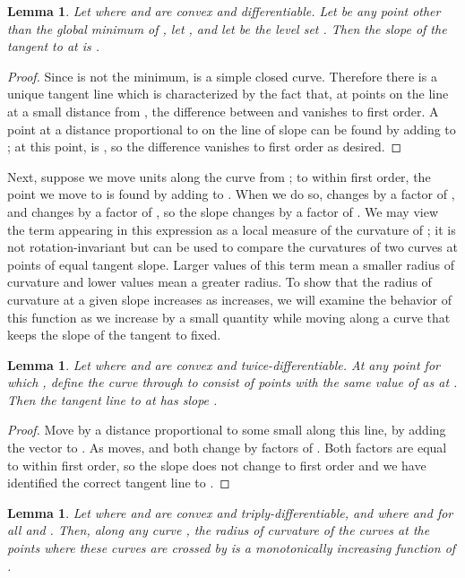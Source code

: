 \documentclass[10pt, conference, compsocconf]{IEEEtran}
\newtheorem{lemma}[theorem]{Lemma}
\begin{document}
\begin{lemma}
Let  where  and  are convex and differentiable.
Let   be any point other than the global minimum of , let , and let  be the level set .
Then the slope of the tangent to  at  is .
\end{lemma}

\begin{proof}
Since  is not the minimum,  is a simple closed curve.
Therefore there is a unique tangent line which is characterized by the fact that, at points  on the line at a small distance  from , the difference between  and  vanishes to first order. A point  at a distance proportional to  on the line of slope  can be found by adding  to ; at this point,  is , so the difference vanishes to first order as desired.
\end{proof}

Next, suppose we move  units along the curve  from ; to within
first order, the point we move to is found by adding
 to . When we do so, 
changes by a factor of
,
and  changes by a factor of , so the slope 
changes by a factor of . We may view the term  appearing in this expression as a local measure of the
curvature of ; it is not rotation-invariant but can be used to compare
the curvatures of two curves at points of equal tangent slope. Larger
values of this term mean a smaller radius of curvature and lower values mean a greater
radius. To show that the radius of curvature at a given slope increases as  increases, we will examine the behavior of this function as we increase  by a small quantity  while moving  along a curve that keeps the slope of the tangent to  fixed.

\begin{lemma}
Let  where  and  are convex and twice-differentiable.
At any point  for which , define the curve  through  to consist of points with the same value of  as at . Then the tangent line to  at  has slope .
\end{lemma}

\begin{proof}
Move  by a distance proportional to some small  along this line, by adding the vector  to . As  moves,  and  both change by factors of . Both factors are equal to within first order, so the slope  does not change to first order and we have identified the correct tangent line to .
\end{proof}

\begin{lemma}
\label{lem:curvature}
Let  where  and  are convex and triply-differentiable, and where  and  for all  and . Then, along any curve , the radius of curvature of the curves  at the points where these curves are crossed by  is a monotonically increasing function of .
\end{lemma}
\end{document}

